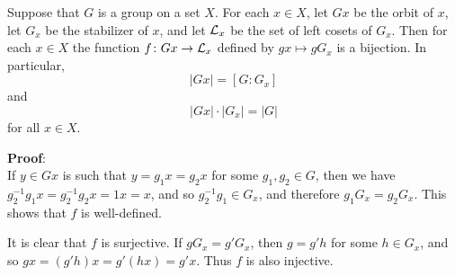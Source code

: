 \documentclass{article}
\begin{document}
Suppose that $G$ is a group  on a set $X$.
For each $x\in X$, let $Gx$ be the orbit of $x$,
let $G_x$ be the stabilizer of $x$,
and let ${\cal L}_x$ be the set of left cosets of $G_x$.
Then for each $x\in X$ the function $f\colon Gx\to{\cal L}_x$
defined by $gx\mapsto gG_x$ is a bijection.
In particular,
\[
  |Gx| = [G:G_x]
\]
and
\[
  |Gx|\cdot|G_x| = |G|
\]
for all $x\in X$.

{\bf Proof}:\\
If $y\in Gx$ is such that $y=g_1x=g_2x$ for some $g_1,g_2\in G$,
then we have $g_2^{-1}g_1x=g_2^{-1}g_2x=1x=x$, and so $g_2^{-1}g_1\in G_x$,
and therefore $g_1G_x=g_2G_x$.
This shows that $f$ is well-defined.

It is clear that $f$ is surjective.
If $gG_x = g'G_x$, then $g = g'h$ for some $h \in G_x$,
and so $gx = (g'h)x= g'(hx) = g'x$.
Thus $f$ is also injective.
\end{document}
